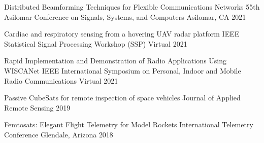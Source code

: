 
\begin{cvhonors}

    \cvhonor
    {Distributed Beamforming Techniques for Flexible Communications Networks}
    {55th Asilomar Conference on Signals, Systems, and Computers}
    {Asilomar, CA}
    {2021}

    \cvhonor
    {Cardiac and respiratory sensing from a hovering UAV radar platform}
    {IEEE Statistical Signal Processing Workshop (SSP)}
    {Virtual}
    {2021}

    \cvhonor
    {Rapid Implementation and Demonstration of Radio Applications Using WISCANet}
    {IEEE International Symposium on Personal, Indoor and Mobile Radio Communications}
    {Virtual}
    {2021}

  \cvhonor
  {Passive CubeSats for remote inspection of space vehicles} %
  {Journal of Applied Remote Sensing} %
  {} %
    {2019} %

  \cvhonor
  {Femtosats: Elegant Flight Telemetry for Model Rockets} %
  {International Telemetry Conference} %
  {Glendale, Arizona} %
    {2018} %

\end{cvhonors}
